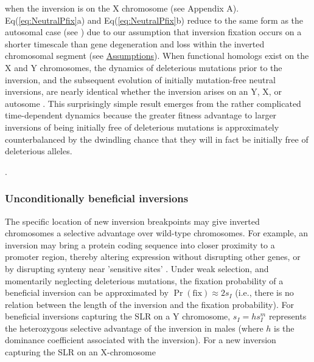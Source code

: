 \documentclass{article}[12pt]
\begin{document}
\noindent when the inversion is on the X chromosome (see Appendix A). Eq(\ref{eq:NeutralPfix}a) and Eq(\ref{eq:NeutralPfix}b) reduce to the same form as the autosomal case (see \citealt{Nei1967, ConnallonOlito2020}) due to our assumption that inversion fixation occurs on a shorter timescale than gene degeneration and loss within the inverted chromosomal segment (see \hyperref[sec:assumptions]{Assumptions}). When functional homologs exist on the X and Y chromosomes, the dynamics of deleterious mutations prior to the inversion, and the subsequent evolution of initially mutation-free neutral inversions, are nearly identical whether the inversion arises on an Y, X, or autosome \citet{ConnallonOlito2020}. This surprisingly simple result emerges from the rather complicated time-dependent dynamics because the greater fitness advantage to larger inversions of being initially free of deleterious mutations is approximately counterbalanced by the dwindling chance that they will in fact be initially free of deleterious alleles. \vspace{12pt}

.


\subsubsection*{Unconditionally beneficial inversions}

The specific location of new inversion breakpoints may give inverted chromosomes a selective advantage over wild-type chromosomes. For example, an inversion may bring a protein coding sequence into closer proximity to a promoter region, thereby altering expression without disrupting other genes, or by disrupting synteny near 'sensitive sites' \citep{KrimbasPowell1992, CorbettDetig2016}. Under weak selection, and momentarily neglecting deleterious mutations, the fixation probability of a beneficial inversion can be approximated by $\Pr(\text{fix}) \approx 2 s_{I}$ \citep{Haldane1927} (i.e., there is no relation between the length of the inversion and the fixation probability). For beneficial inversions capturing the SLR on a Y chromosome, $s_I = h s_{I}^{m}$ represents the heterozygous selective advantage of the inversion in males (where $h$ is the dominance coefficient associated with the inversion). For a new inversion capturing the SLR on an X-chromosome
\end{document}
